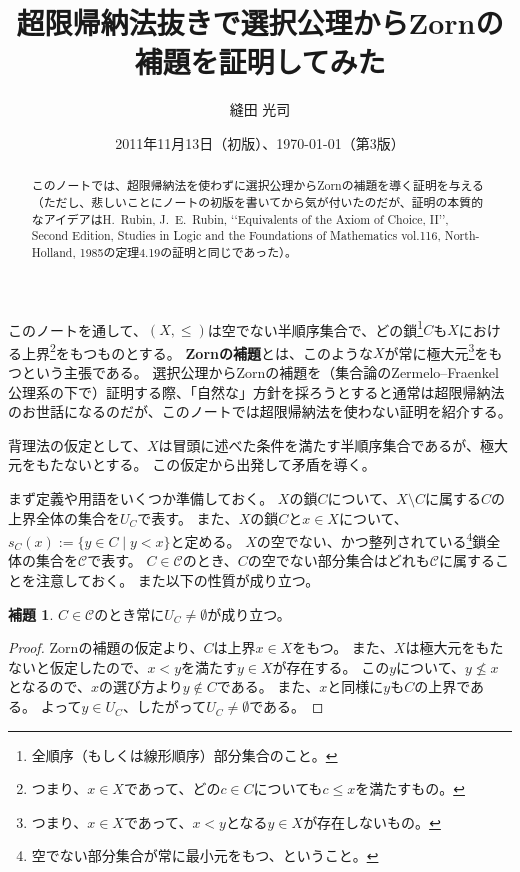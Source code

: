 ﻿\documentclass{ltjsarticle}
\title{超限帰納法抜きで選択公理からZornの補題を証明してみた}
\author{縫田 光司}
\date{2011年11月13日（初版）、\today （第3版）}
\theoremstyle{definition}
\newtheorem{lemma}{補題}
\begin{document}
\maketitle

\begin{abstract}
このノートでは、超限帰納法を使わずに選択公理からZornの補題を導く証明を与える（ただし、悲しいことにノートの初版を書いてから気が付いたのだが、証明の本質的なアイデアはH.~Rubin, J.~E.~Rubin, \lq\lq Equivalents of the Axiom of Choice, II\rq\rq, Second Edition, Studies in Logic and the Foundations of Mathematics vol.116, North-Holland, 1985の定理4.19の証明と同じであった）。
\end{abstract}

このノートを通して、$(X,\leq)$は空でない半順序集合で、どの鎖\footnote{全順序（もしくは線形順序）部分集合のこと。}$C$も$X$における上界\footnote{つまり、$x \in X$であって、どの$c \in C$についても$c \leq x$を満たすもの。}をもつものとする。
\textbf{Zornの補題}とは、このような$X$が常に極大元\footnote{つまり、$x \in X$であって、$x < y$となる$y \in X$が存在しないもの。}をもつという主張である。
選択公理からZornの補題を（集合論のZermelo--Fraenkel公理系の下で）証明する際、「自然な」方針を採ろうとすると通常は超限帰納法のお世話になるのだが、このノートでは超限帰納法を使わない証明を紹介する。

背理法の仮定として、$X$は冒頭に述べた条件を満たす半順序集合であるが、極大元をもたないとする。
この仮定から出発して矛盾を導く。

まず定義や用語をいくつか準備しておく。
$X$の鎖$C$について、$X \setminus C$に属する$C$の上界全体の集合を$U_C$で表す。
また、$X$の鎖$C$と$x \in X$について、$s_C(x) := \{ y \in C \mid y < x \}$と定める。
$X$の空でない、かつ整列されている\footnote{空でない部分集合が常に最小元をもつ、ということ。}鎖全体の集合を$\mathcal{C}$で表す。
$C \in \mathcal{C}$のとき、$C$の空でない部分集合はどれも$\mathcal{C}$に属することを注意しておく。
また以下の性質が成り立つ。

\begin{lemma}
    \label{lem:Zorn:chain_has_proper_upper_bound}
    $C \in \mathcal{C}$のとき常に$U_C \neq \emptyset$が成り立つ。
\end{lemma}
\begin{proof}
    Zornの補題の仮定より、$C$は上界$x \in X$をもつ。
    また、$X$は極大元をもたないと仮定したので、$x < y$を満たす$y \in X$が存在する。
    この$y$について、$y \not\leq x$となるので、$x$の選び方より$y \not\in C$である。
    また、$x$と同様に$y$も$C$の上界である。
    よって$y \in U_C$、したがって$U_C \neq \emptyset$である。
\end{proof}
\end{document}
